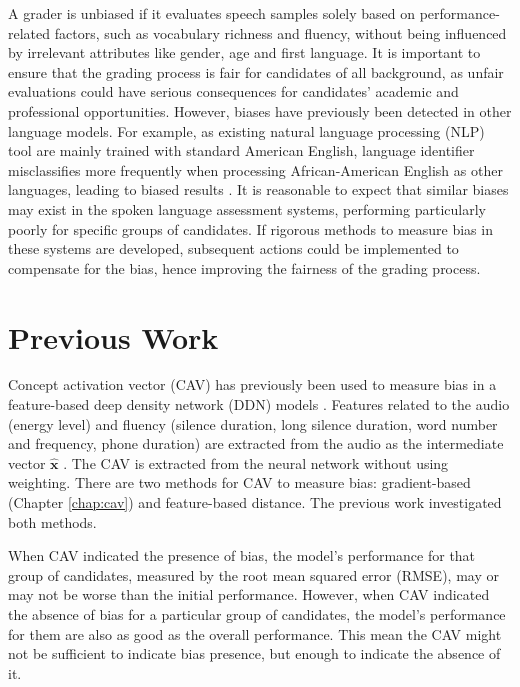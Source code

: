 A grader is unbiased if it evaluates speech samples solely based on performance-related factors, such as vocabulary richness and fluency, without being influenced by irrelevant attributes like gender, age and first language. It is important to ensure that the grading process is fair for candidates of all background, as unfair evaluations could have serious consequences for candidates' academic and professional opportunities. However, biases have previously been detected in other language models. For example, as existing natural language processing (NLP) tool are mainly trained with standard American English, language identifier misclassifies more frequently when processing African-American English as other languages, leading to biased results \cite{bias}. It is reasonable to expect that similar biases may exist in the spoken language assessment systems, performing particularly poorly for specific groups of candidates. If rigorous methods to measure bias in these systems are developed, subsequent actions could be implemented to compensate for the bias, hence improving the fairness of the grading process.

\section{Previous Work}
Concept activation vector (CAV)  has previously been used to measure bias in a feature-based deep density network (DDN)  models \cite{feature_bias}. Features related to the audio (energy level) and fluency (silence duration, long silence duration, word number and frequency, phone duration) are extracted from the audio as the intermediate vector $\mathbf{\hat{x}}$ \cite{feature_vector_old}. The CAV is extracted from the neural network without using weighting. There are two methods for CAV to measure bias: gradient-based (Chapter \ref{chap:cav}) and feature-based distance. The previous work investigated both methods.


When CAV indicated the presence of bias, the model's performance for that group of candidates, measured by the root mean squared error (RMSE),  may or may not be worse than the initial performance. However, when CAV indicated the absence of bias for a particular group of candidates, the model's performance for them are also as good as the overall performance. This mean the CAV might not be sufficient to indicate bias presence, but enough to indicate the absence of it.

